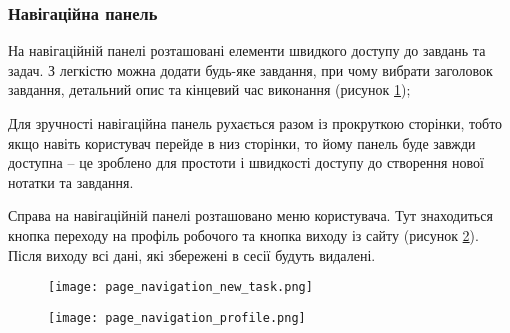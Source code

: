 \subsubsection{Навігаційна панель}
\par На навігаційній панелі розташовані елементи швидкого доступу до завдань та задач.
З легкістю можна додати будь-яке завдання, при чому вибрати заголовок завдання, детальний опис та кінцевий час виконання (рисунок \ref{pic:page_navigation_new_task});

\par Для зручності навігаційна панель рухається разом із прокруткою сторінки, тобто якщо навіть користувач перейде в низ сторінки, то йому панель буде завжди доступна -- це зроблено для простоти і швидкості доступу до створення нової нотатки та завдання.
\par Справа на навігаційній панелі розташовано меню користувача. Тут знаходиться кнопка переходу на профіль робочого та кнопка виходу із сайту (рисунок \ref{pic:page_navigation_profile}). Після виходу всі дані, які збережені в сесії будуть видалені.

\begin{figure}[!ht]
\centering
    \texttt{[image: page\_navigation\_new\_task.png]}
    \vspace{18pt}
    \label{pic:page_navigation_new_task}
\end{figure}

\begin{figure}[!ht]
\centering
    \texttt{[image: page\_navigation\_profile.png]}
    \vspace{18pt}
    \label{pic:page_navigation_profile}
\end{figure}


